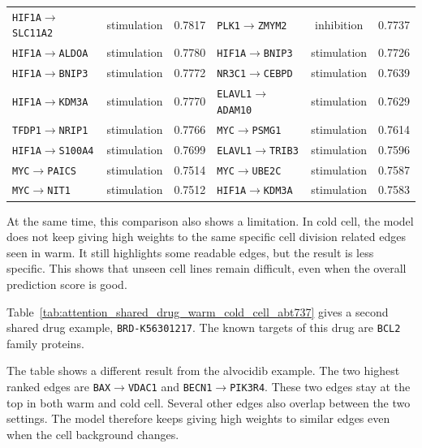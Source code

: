 \begin{table}[htbp]
\begin{tabular}{lcllcl}
\texttt{HIF1A}$\rightarrow$\texttt{SLC11A2} & stimulation & 0.7817 & \texttt{PLK1}$\rightarrow$\texttt{ZMYM2} & inhibition & 0.7737 \\
\texttt{HIF1A}$\rightarrow$\texttt{ALDOA} & stimulation & 0.7780 & \texttt{HIF1A}$\rightarrow$\texttt{BNIP3} & stimulation & 0.7726 \\
\texttt{HIF1A}$\rightarrow$\texttt{BNIP3} & stimulation & 0.7772 & \texttt{NR3C1}$\rightarrow$\texttt{CEBPD} & stimulation & 0.7639 \\
\texttt{HIF1A}$\rightarrow$\texttt{KDM3A} & stimulation & 0.7770 & \texttt{ELAVL1}$\rightarrow$\texttt{ADAM10} & stimulation & 0.7629 \\
\texttt{TFDP1}$\rightarrow$\texttt{NRIP1} & stimulation & 0.7766 & \texttt{MYC}$\rightarrow$\texttt{PSMG1} & stimulation & 0.7614 \\
\texttt{HIF1A}$\rightarrow$\texttt{S100A4} & stimulation & 0.7699 & \texttt{ELAVL1}$\rightarrow$\texttt{TRIB3} & stimulation & 0.7596 \\
\texttt{MYC}$\rightarrow$\texttt{PAICS} & stimulation & 0.7514 & \texttt{MYC}$\rightarrow$\texttt{UBE2C} & stimulation & 0.7587 \\
\texttt{MYC}$\rightarrow$\texttt{NIT1} & stimulation & 0.7512 & \texttt{HIF1A}$\rightarrow$\texttt{KDM3A} & stimulation & 0.7583 \\
\hline
\end{tabular}
\end{table}

\noindent At the same time, this comparison also shows a limitation. In cold cell, the model does not keep giving high weights to the same specific cell division related edges seen in warm. It still highlights some readable edges, but the result is less specific. This shows that unseen cell lines remain difficult, even when the overall prediction score is good.

\noindent Table~\ref{tab:attention_shared_drug_warm_cold_cell_abt737} gives a second shared drug example, \texttt{BRD-K56301217}. The known targets of this drug are \texttt{BCL2} family proteins.

\noindent The table shows a different result from the alvocidib example. The two highest ranked edges are \texttt{BAX}$\rightarrow$\texttt{VDAC1} and \texttt{BECN1}$\rightarrow$\texttt{PIK3R4}. These two edges stay at the top in both warm and cold cell. Several other edges also overlap between the two settings. The model therefore keeps giving high weights to similar edges even when the cell background changes.


